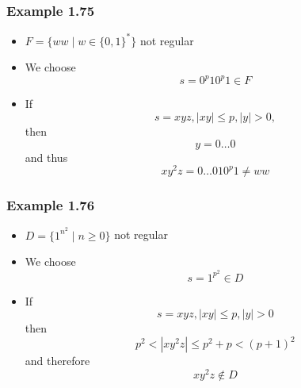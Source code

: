\begin{frame}[allowframebreaks] \frametitle{Example 1.75}
  \begin{itemize}
\item $F=\{ww\mid w \in \{0,1\}^*\}$ not regular
\item We choose
  \begin{equation*}
s=0^p 1 0^p 1 \in F
\end{equation*}
\item If
  \begin{equation*}
    s =xyz,
    |xy|
\leq p, |y|>0,
\end{equation*}
then
\begin{equation*}
 y = 0\ldots 0
\end{equation*}
and thus
\begin{equation*}
xy^2z = 0 \ldots 0 1 0^p 1\neq ww
\end{equation*}
\end{itemize}\end{frame} \begin{frame}[allowframebreaks] \frametitle{Example 1.76}
  \begin{itemize}
\item $D=\{1^{n^2}
\mid n \geq 0\}$ not regular
\item We choose
  \begin{equation*}
  s=1^{p^2} \in D
\end{equation*}
\item If 
  \begin{equation*}
s =xyz, |xy |\leq p, |y|>0
\end{equation*}
then 
\begin{equation*}
p^2 < |xy^2z| \leq p^2 +p < (p+1)^2
\end{equation*}
and therefore
\begin{equation*}
  xy^2 z \notin D
\end{equation*}
\end{itemize}\end{frame}


